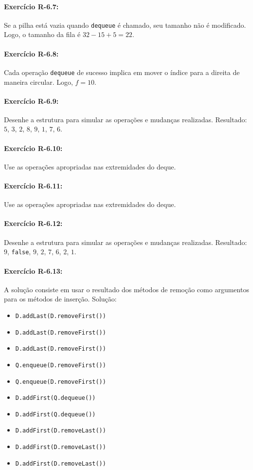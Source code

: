 \paragraph{Exercício R-6.7:}
Se a pilha está vazia quando \texttt{dequeue} é chamado, seu tamanho não é modificado. Logo, o tamanho da fila é $32 - 15 + 5 = 22$.

\paragraph{Exercício R-6.8:}
Cada operação \texttt{dequeue} de sucesso implica em mover o índice para a direita de maneira circular. Logo, $f = 10$.

\paragraph{Exercício R-6.9:}
Desenhe a estrutura para simular as operações e mudanças realizadas. Resultado: $5$, $3$, $2$, $8$, $9$, $1$, $7$, $6$.

\paragraph{Exercício R-6.10:}
Use as operações apropriadas nas extremidades do deque.

\paragraph{Exercício R-6.11:}
Use as operações apropriadas nas extremidades do deque.

\paragraph{Exercício R-6.12:}
Desenhe a estrutura para simular as operações e mudanças realizadas. Resultado: $9$, \texttt{false}, $9$, $2$, $7$, $6$, $2$, $1$.

\paragraph{Exercício R-6.13:}
A solução consiste em usar o resultado dos métodos de remoção como argumentos para os métodos de inserção. Solução:
\begin{itemize}
	\item \texttt{D.addLast(D.removeFirst())}
	\item \texttt{D.addLast(D.removeFirst())}
	\item \texttt{D.addLast(D.removeFirst())}
	\item \texttt{Q.enqueue(D.removeFirst())}
	\item \texttt{Q.enqueue(D.removeFirst())}
	\item \texttt{D.addFirst(Q.dequeue())}
	\item \texttt{D.addFirst(Q.dequeue())}
	\item \texttt{D.addFirst(D.removeLast())}
	\item \texttt{D.addFirst(D.removeLast())}
	\item \texttt{D.addFirst(D.removeLast())}
\end{itemize}

